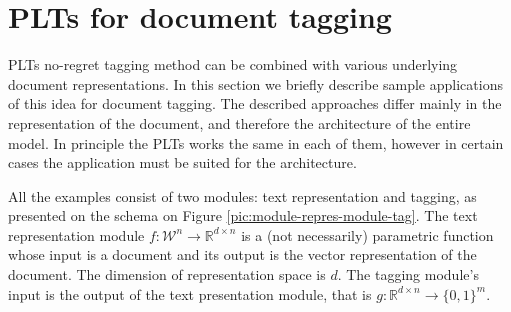 \documentclass{article}
\newcommand{\cD}{\mathcal{D}}
\newcommand{\bd}{\mathbf{d}}
\newcommand{\calW}{\mathcal{W}}
\newcommand\R{\mathbb{R}}   %
\newcommand{\sectionBefore}{-0pt}
\newcommand{\sectionAfter}{-0pt}
\begin{document}
\vspace{\sectionBefore}
\section{PLTs for document tagging}
\label{sec:tagging_PLTs}
\vspace{\sectionAfter}

PLTs no-regret tagging method can be combined with various underlying document representations. In this section we briefly describe sample applications of this idea for document tagging. 
The described approaches differ mainly in the representation of the document, and therefore the architecture of the entire model. In principle the PLTs works the same in each of them, however in certain cases the application must be suited for the architecture.


All the examples consist of two modules: text representation and tagging, as presented on the schema on Figure \ref{pic:module-repres-module-tag}. The text representation module $f : \calW^{n} \rightarrow \R^{d \times n}$ is a (not necessarily) parametric function whose input is a document and its output is the vector representation of the document. The dimension of representation space is $d$. 
The tagging module's input is the output of the text presentation module, that is $g: \R^{d \times n} \rightarrow  \{ 0 , 1 \}^m$. 

\end{document}

